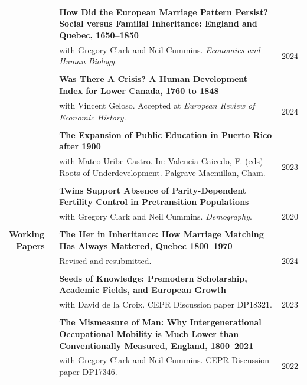 \documentclass[a4paper,11pt,oneside]{article}
\begin{document}
\begin{longtable}{@{} p{0.175\linewidth} p{0.775\linewidth} p{0.05\linewidth}}
   & \textbf{How Did the European Marriage Pattern Persist? Social versus Familial Inheritance: England and Quebec, 1650--1850 }\\ 
   &   with Gregory Clark and Neil Cummins. \emph{Economics and Human Biology.}  & \hfill 2024 \\
   \\
   &  \textbf{Was There A Crisis? A Human Development Index for Lower Canada, 1760 to 1848 } \\   &   with Vincent Geloso.  Accepted at \emph{European Review of Economic History}. & \hfill 2024\\
   \\

   & \textbf{The Expansion of Public Education in Puerto Rico after 1900} \\
   & with Mateo Uribe-Castro. In: Valencia Caicedo, F. (eds) Roots of Underdevelopment. Palgrave Macmillan, Cham. & \hfill 2023\\
   \\
    & \textbf{Twins Support Absence of Parity-Dependent Fertility Control in Pretransition Populations }\\
   &  with Gregory Clark and Neil Cummins. \emph{Demography}. & \hfill 2020\\
   \\  


    
   \textbf{\large{Working \(\phantom{1}\)  Papers}}  
   & \textbf{The Her in Inheritance: How Marriage Matching Has Always Mattered, Quebec 1800--1970}\\ 
   &  Revised and resubmitted. &  \hfill 2024  \\
   & &
   \\  

   & \textbf{Seeds of Knowledge: Premodern Scholarship, Academic Fields, and European Growth }\\ 
   &   with David de la Croix. CEPR Discussion paper DP18321. & 2023 \\
   & &
   \\ 
   
   & \textbf{The Mismeasure of Man: Why Intergenerational Occupational Mobility  is Much Lower than Conventionally Measured, England, 1800--2021}\\ 
   &  with Gregory Clark and Neil Cummins. CEPR Discussion paper DP17346. &2022   \\


\end{longtable}
\end{document}
